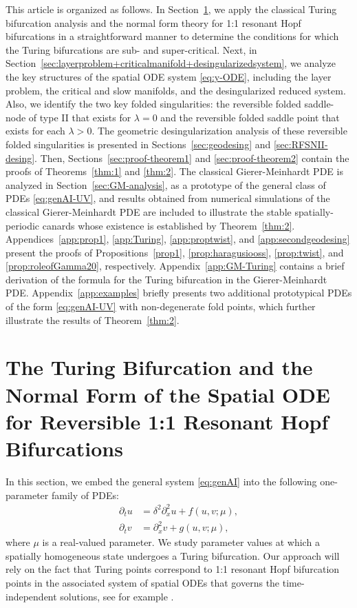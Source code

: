\documentclass[11pt]{article}
\numberwithin{equation}{section}
\begin{document}
This article is organized as follows.
In Section~\ref{sec:Turing+NF}, we apply the classical Turing bifurcation analysis
and the normal form theory for 1:1 resonant Hopf bifurcations in a straightforward manner to determine the conditions for which the Turing bifurcations are sub- and super-critical.
Next, in Section~\ref{sec:layerproblem+criticalmanifold+desingularizedsystem}, we analyze the key structures of the spatial ODE system \eqref{eq:y-ODE}, including the layer problem, the critical and slow manifolds, and the desingularized reduced system. 
Also, we identify the two key folded singularities: the reversible folded saddle-node of type II that exists for $\lambda=0$ and the reversible folded saddle point that exists for each $\lambda>0$.
The geometric desingularization analysis of these reversible folded singularities is presented in Sections~\ref{sec:geodesing} and \ref{sec:RFSNII-desing}.
Then, Sections~\ref{sec:proof-theorem1} and \ref{sec:proof-theorem2} contain the proofs of Theorems~\ref{thm:1} and \ref{thm:2}.
The classical Gierer-Meinhardt PDE is analyzed in Section~\ref{sec:GM-analysis}, as a prototype of the general class of PDEs \eqref{eq:genAI-UV}, and results obtained from numerical simulations of the classical Gierer-Meinhardt PDE are included to illustrate
the stable spatially-periodic canards whose existence is established by Theorem~\ref{thm:2}.
Appendices~\ref{app:prop1}, \ref{app:Turing}, \ref{app:proptwist}, and \ref{app:secondgeodesing} present the proofs of Propositions~\ref{prop1}, \ref{prop:haragusiooss}, \ref{prop:twist}, and \ref{prop:roleofGamma20}, respectively.
Appendix~\ref{app:GM-Turing} contains a brief derivation of the formula for the Turing bifurcation in the Gierer-Meinhardt PDE.
Appendix~\ref{app:examples} briefly presents two additional prototypical PDEs of the form \eqref{eq:genAI-UV} with non-degenerate fold points, which further illustrate the results of Theorem~\ref{thm:2}.



\section{The Turing Bifurcation and the Normal Form of the Spatial ODE for Reversible 1:1 Resonant Hopf Bifurcations} \label{sec:Turing+NF}

In this section, we embed the general system \eqref{eq:genAI} into the following one-parameter family of PDEs: 
\begin{equation}  \label{eq:genAI-mu}
\begin{split}
    \partial_t u &= \delta^2 \partial_x^2 u + f(u,v;\mu), \\
    \partial_t v &= \partial_x^2 v + g(u,v;\mu),
    \end{split}
\end{equation} 
%
where $\mu$ is a real-valued parameter.
We study parameter values at which a spatially homogeneous state undergoes a Turing bifurcation.
Our approach will rely on the fact that Turing points correspond to 1:1 resonant Hopf bifurcation points in the associated system of spatial ODEs that governs the time-independent solutions, see for example \cite{E1965,HI2011,IMD1989,IP1993}.
\end{document}
